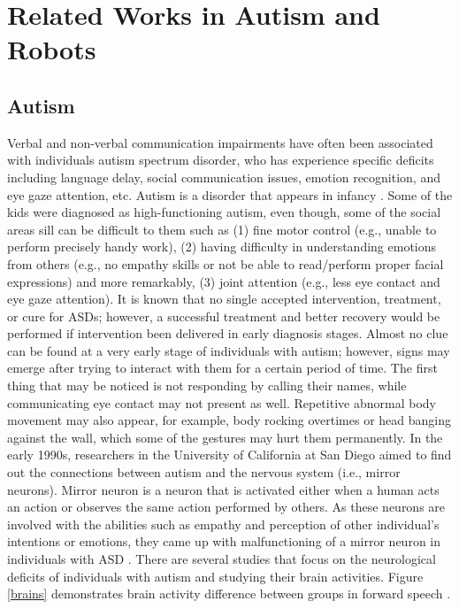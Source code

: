 \chapter{Related Works in Autism and Robots}

\section{Autism}
Verbal and non-verbal communication impairments have often been associated with individuals 
autism spectrum disorder, who has experience specific deficits including language delay, 
social communication issues, emotion recognition, and eye gaze attention, etc. Autism
is a disorder that appears in infancy \cite{lotter1966epidemiology}. Some of the kids
were diagnosed as high-functioning autism, even though, some of the social areas sill 
can be difficult to them such as (1) fine motor control (e.g., unable to perform precisely 
handy work), (2) having difficulty in understanding emotions from others (e.g., no empathy
skills or not be able to read/perform proper facial expressions) and more remarkably, (3)
joint attention (e.g., less eye contact and eye gaze attention)\cite{lotter1966epidemiology}.
It is known that no single accepted intervention, treatment, or cure for ASDs; however, a 
successful treatment and better recovery would be performed if intervention been delivered
in early diagnosis stages. Almost no clue can be found at a very early stage of individuals with 
autism; however, signs may emerge after trying to interact with them for a certain period of time.
The first thing that may be noticed is not responding by calling their names, while communicating
eye contact may not present as well. Repetitive abnormal body movement may also appear, for
example, body rocking overtimes or head banging against the wall, which some of the gestures
may hurt them permanently. In the early 1990s, researchers in the University of California at 
San Diego aimed to find out the connections between autism and the nervous system (i.e., mirror 
neurons). Mirror neuron \cite{ramachandran2006broken} is a neuron that is activated 
either when a human acts an action or observes the same action performed by others. 
As these neurons are involved with the abilities such as empathy and perception of 
other individual’s intentions or emotions, they came up with malfunctioning of a mirror 
neuron in individuals with ASD \cite{ramachandran2006broken}. There are several studies
that focus on the neurological deficits of individuals with autism and studying their
brain activities. Figure \ref{brains} demonstrates brain activity difference between groups
in forward speech \cite{redcay2008deviant}. \\

